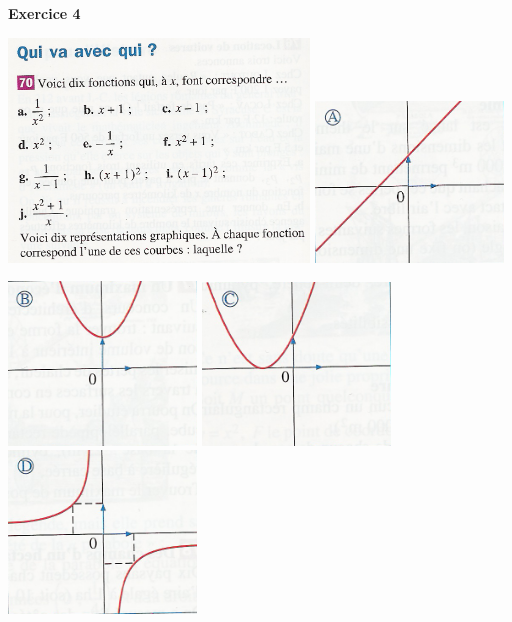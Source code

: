 \documentclass[12pt, twoside]{article}
\begin{document}
\pagebreak



\textbf{Exercice 4}

\bigskip

\includegraphics[width=8cm]{images/synthese.png} \qquad \quad \quad
\includegraphics[width=5cm]{images/A.png} 

\bigskip

\bigskip

\includegraphics[width=5cm]{images/B.png} \qquad \quad \quad
\includegraphics[width=5cm]{images/C.png} \qquad \quad \quad
\includegraphics[width=5cm]{images/D.png} 
\end{document}

